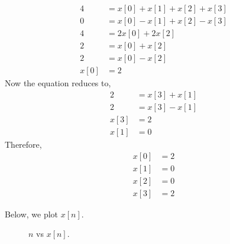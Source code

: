 \documentclass[10pt,a4paper, margin=1in]{article}
\begin{document}
\begin{enumerate}
\begin{enumerate}
\begin{equation}
\begin{split}
    	4 & = x[0]+x[1]+x[2]+x[3] \\
	0 & = x[0] - x[1] + x[2] - x[3] \\
	4 & = 2x[0] + 2x[2] \\
	2 & = x[0] +x[2] \\ 
	2 & = x[0] - x[2] \\
	x[0] & = 2 
    \end{split}
    \end{equation}
    Now the equation reduces to,
    \begin{equation}
    \begin{split}
    	2 & = x[3]+x[1] \\
	2 & = x[3] - x[1] \\
	x[3] &= 2 \\
	x[1] & = 0
    \end{split}
    \end{equation}
    Therefore, 
    \begin{equation}
    \begin{split}
	x[0] & = 2 \\
	x[1] & = 0 \\
	x[2] & = 0\\
	x[3] &= 2 
    \end{split}
    \end{equation}
    
    \end{enumerate}
    
    Below, we plot $x[n]$.
    
     \begin{figure} [H]
    \centering
    \caption{$n$ vs $x[n]$.}
    \label{fig:q1}
\end{figure}
    
    
    
    



\end{enumerate}
\end{document}
